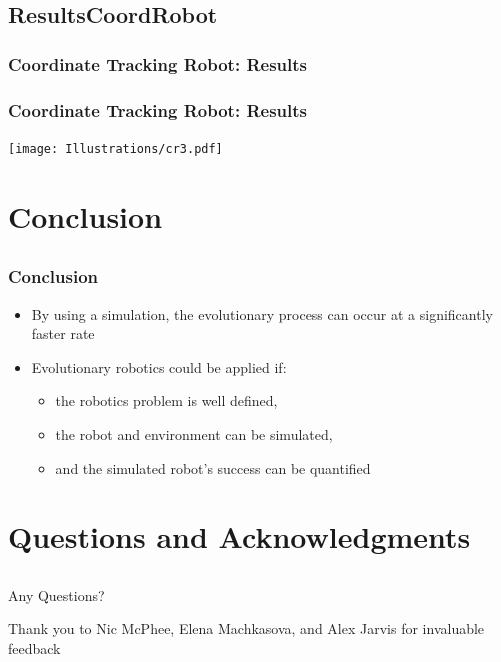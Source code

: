 \documentclass{beamer}
\begin{document}
\subsection{ResultsCoordRobot}
\begin{frame}
  \frametitle{Coordinate Tracking Robot: Results}
\end{frame}

\begin{frame}
  \frametitle{Coordinate Tracking Robot: Results}
\begin{center}
 \texttt{[image: Illustrations/cr3.pdf]}
       \\
\end{center}
\end{frame}

\section{Conclusion}
\subsection{}
\begin{frame}
  \frametitle{Conclusion}
  \begin{itemize}
\item By using a simulation, the evolutionary process can occur at a significantly faster rate
\item Evolutionary robotics could be applied if:
 \begin{itemize}
\item the robotics problem is well defined, %
\item the robot and environment can be simulated,
\item and the simulated robot's success can be quantified
\end{itemize}
\end{itemize}
\end{frame}

\section{Questions and Acknowledgments}
\subsection{}
\begin{frame}
  \frametitle{}
  Any Questions?

Thank you to Nic McPhee, Elena Machkasova, and Alex Jarvis for invaluable feedback
\end{frame}
\end{document}
